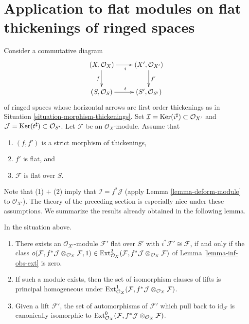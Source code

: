 \section{Application to flat modules on flat thickenings of ringed spaces}
\label{section-flat}

\noindent
Consider a commutative diagram
$$
\xymatrix{
(X, \mathcal{O}_X) \ar[r]_i \ar[d]_f & (X', \mathcal{O}_{X'}) \ar[d]^{f'} \\
(S, \mathcal{O}_S) \ar[r]^t & (S', \mathcal{O}_{S'})
}
$$
of ringed spaces whose horizontal arrows are first order thickenings as in
Situation \ref{situation-morphism-thickenings}. Set
$\mathcal{I} = \mathop{\mathrm{Ker}}(i^\sharp) \subset \mathcal{O}_{X'}$ and
$\mathcal{J} = \mathop{\mathrm{Ker}}(t^\sharp) \subset \mathcal{O}_{S'}$.
Let $\mathcal{F}$ be an $\mathcal{O}_X$-module. Assume that
\begin{enumerate}
\item $(f, f')$ is a strict morphism of thickenings,
\item $f'$ is flat, and
\item $\mathcal{F}$ is flat over $S$.
\end{enumerate}
Note that (1) $+$ (2) imply that $\mathcal{I} = f^*\mathcal{J}$
(apply Lemma \ref{lemma-deform-module} to $\mathcal{O}_{X'}$).
The theory of the preceding section is especially nice
under these assumptions. We summarize the results already obtained
in the following lemma.

\begin{lemma}
\label{lemma-flat}
In the situation above.
\begin{enumerate}
\item There exists an $\mathcal{O}_{X'}$-module $\mathcal{F}'$ flat over
$S'$ with $i^*\mathcal{F}' \cong \mathcal{F}$, if and only if
the class
$o(\mathcal{F}, f^*\mathcal{J} \otimes_{\mathcal{O}_X} \mathcal{F}, 1)
\in \mathop{\mathrm{Ext}}\nolimits^2_{\mathcal{O}_X}(
\mathcal{F}, f^*\mathcal{J} \otimes_{\mathcal{O}_X} \mathcal{F})$
of Lemma \ref{lemma-inf-obs-ext} is zero.
\item If such a module exists, then the set of isomorphism classes
of lifts is principal homogeneous under
$\mathop{\mathrm{Ext}}\nolimits^1_{\mathcal{O}_X}(
\mathcal{F}, f^*\mathcal{J} \otimes_{\mathcal{O}_X} \mathcal{F})$.
\item Given a lift $\mathcal{F}'$, the set of automorphisms of
$\mathcal{F}'$ which pull back to $\text{id}_\mathcal{F}$ is canonically
isomorphic to $\mathop{\mathrm{Ext}}\nolimits^0_{\mathcal{O}_X}(
\mathcal{F}, f^*\mathcal{J} \otimes_{\mathcal{O}_X} \mathcal{F})$.
\end{enumerate}
\end{lemma}


